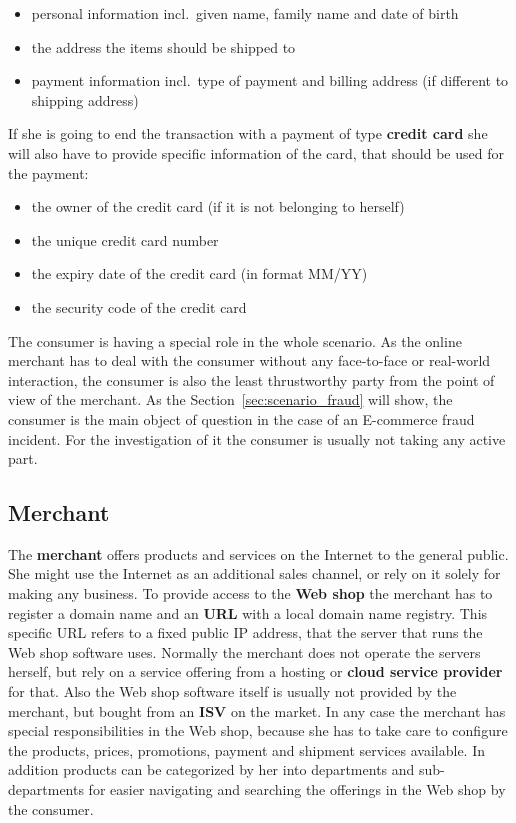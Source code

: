 \begin{itemize}
		\item personal information incl.\ given name, family name and date of birth
		\item the address the items should be shipped to
		\item payment information incl.\ type of payment and billing address (if different to shipping address)
\end{itemize}

If she is going to end the transaction with a payment of type \textbf{credit card} she will also have to provide specific information of the card, that should be used for the payment:\@

\begin{itemize}
		\item the owner of the credit card (if it is not belonging to herself)
		\item the unique credit card number
		\item the expiry date of the credit card (in format MM/YY)
		\item the security code of the credit card
\end{itemize}

The consumer is having a special role in the whole scenario. As the online merchant has to deal with the consumer without any face-to-face or real-world interaction, the consumer is also the least thrustworthy party from the point of view of the merchant. As the Section~\ref{sec:scenario_fraud} will show, the consumer is the main object of question in the case of an E-commerce fraud incident. For the investigation of it the consumer is usually not taking any active part.


\subsection{Merchant}
\label{subsec:stakeholder_merchant}

The \textbf{merchant} offers products and services on the Internet to the general public. She might use the Internet as an additional sales channel, or rely on it solely for making any business. To provide access to the \textbf{Web shop} the merchant has to register a domain name and an \textbf{\gls{URL}} with a local domain name registry. This specific \gls{URL} refers to a fixed public \gls{IP} address, that the server that runs the Web shop software uses. Normally the merchant does not operate the servers herself, but rely on a service offering from a hosting or \textbf{cloud service provider} for that. Also the Web shop software itself is usually not provided by the merchant, but bought from an \textbf{\gls{ISV}} on the market. In any case the merchant has special responsibilities in the Web shop, because she has to take care to configure the products, prices, promotions, payment and shipment services available. In addition products can be categorized by her into departments and sub-departments for easier navigating and searching the offerings in the Web shop by the consumer. \\

